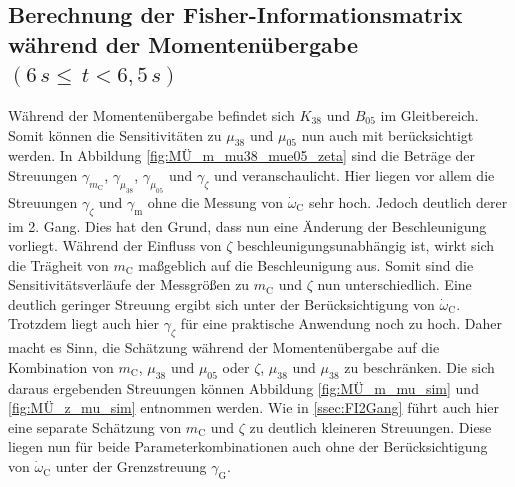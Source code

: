 \subsection{Berechnung der Fisher-Informationsmatrix während der Momentenübergabe $(6\, s\leq\, t<6,5\, s )$}\label{ssec:FIMÜ}

Während der Momentenübergabe befindet sich $K_{38}$ und $B_{05}$ im Gleitbereich. Somit können die Sensitivitäten zu $\mu_{38}$ und $\mu_{05}$ nun auch mit berücksichtigt werden.
In Abbildung \ref{fig:MÜ_m_mu38_mue05_zeta} sind die Beträge der Streuungen $\gamma_{m_\mathrm{C}}$, $\gamma_{\mu_{38}}$, $\gamma_{\mu_{05}}$ und $\gamma_{\zeta}$  und  veranschaulicht. Hier liegen vor allem die Streuungen $\gamma_{\zeta}$  und $\gamma_\mathrm{m}$ ohne die Messung von $\dot{\omega}_\mathrm{C}$ sehr hoch. Jedoch deutlich derer im 2. Gang. Dies hat den Grund, dass nun eine Änderung der Beschleunigung vorliegt. Während der Einfluss von $\zeta$ beschleunigungsunabhängig ist, wirkt sich die Trägheit von $m_\mathrm{C}$ maßgeblich auf die Beschleunigung aus. Somit sind die Sensitivitätsverläufe der Messgrößen zu $m_\mathrm{C}$ und $\zeta$ nun unterschiedlich. Eine deutlich geringer Streuung ergibt sich unter der Berücksichtigung von $\dot{\omega}_\mathrm{C}$. Trotzdem liegt auch hier $\gamma_{\zeta}$ für eine praktische Anwendung noch zu hoch. Daher macht es Sinn, die Schätzung während der Momentenübergabe auf die Kombination von $m_\mathrm{C}$, $\mu_{38}$ und $\mu_{05}$ oder $\zeta$, $\mu_{38}$ und $\mu_{38}$ zu beschränken. Die sich daraus ergebenden Streuungen können Abbildung \ref{fig:MÜ_m_mu_sim} und \ref{fig:MÜ_z_mu_sim} entnommen werden. Wie in \ref{ssec:FI2Gang} führt auch hier eine separate Schätzung von $m_\mathrm{C}$ und $\zeta$ zu deutlich kleineren Streuungen. Diese liegen nun für beide Parameterkombinationen auch ohne der Berücksichtigung von $\dot{\omega}_\mathrm{C}$ unter der Grenzstreuung $\gamma_\mathrm{G}$.

